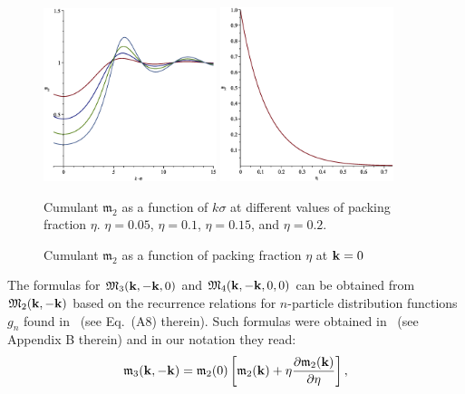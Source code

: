 \begin{figure}[htbp]
	\includegraphics[width=0.45\textwidth,angle=0]{M2_as_function_of_k_at_different_eta} \hfill
	\includegraphics[width=0.45\textwidth,angle=0]{M2_as_function_of_eta_at_k_equals_0} \\
	\parbox{0.5\textwidth}{\caption{\label{m2_vs_k} Cumulant $\mathfrak{m}_2$ as a function of $k\sigma$ at different values of packing fraction $\eta$. $\eta = 0.05$, $\eta=0.1$, $\eta = 0.15$, and $\eta=0.2$.
	}} \hfill
	\parbox{0.45\textwidth}{\caption{\label{m2_vs_eta} Cumulant $\mathfrak{m}_2$ as a function of packing fraction $\eta$ at $\vb k = 0$
	}}
\end{figure}

The formulas for $\mathfrak{M}_3(\vb k, -\vb k, 0)$ and $\mathfrak{M}_4(\vb k, -\vb k, 0, 0)$ can be obtained from $\mathfrak{M}_2(\vb k, -\vb k)$ based on the recurrence relations for $n$-particle distribution functions $g_n$ found in~\cite{Schofield1966} (see Eq.~(A8) therein). Such formulas were obtained in~\cite{YukhJSP1995} (see Appendix B therein) and in our notation they read:
\begin{equation}
	\label{recur_m3_m2}
	\mathfrak{m}_3(\vb k, -\vb k) = \mathfrak{m}_2(0) 
	\left[
		\mathfrak{m}_2(\vb k) + \eta\frac{\partial\mathfrak{m}_2(\vb k)}{\partial\eta}
	\right],
\end{equation}

